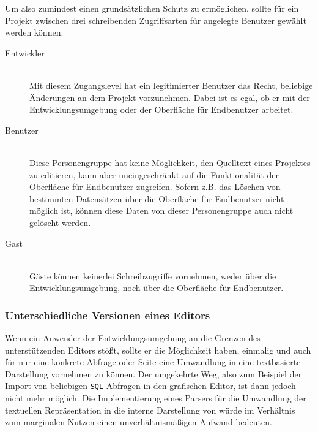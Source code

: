 Um also zumindest einen grundsätzlichen Schutz zu ermöglichen, sollte für ein Projekt zwischen drei schreibenden Zugriffsarten für angelegte Benutzer gewählt werden können:


\begin{description}
  \item[Entwickler] \hfill \\
    Mit diesem Zugangslevel hat ein legitimierter Benutzer das Recht, beliebige Änderungen an dem Projekt vorzunehmen. Dabei ist es egal, ob er mit der Entwicklungsumgebung oder der Oberfläche für Endbenutzer arbeitet.
  \item[Benutzer] \hfill \\
    Diese Personengruppe hat keine Möglichkeit, den Quelltext eines Projektes zu editieren, kann aber uneingeschränkt auf die Funktionalität der Oberfläche für Endbenutzer zugreifen. Sofern z.B. das Löschen von bestimmten Datensätzen über die Oberfläche für Endbenutzer nicht möglich ist, können diese Daten von dieser Personengruppe auch nicht gelöscht werden.
  \item[Gast] \hfill \\
    Gäste können keinerlei Schreibzugriffe vornehmen, weder über die Entwicklungsumgebung, noch über die Oberfläche für Endbenutzer.
\end{description}

\subsubsection{Unterschiedliche Versionen eines Editors}
\label{sec:editor-different-versions}

Wenn ein Anwender der Entwicklungsumgebung an die Grenzen des unterstützenden Editors stößt, sollte er die Möglichkeit haben, einmalig und auch für nur eine konkrete Abfrage oder Seite eine Umwandlung in eine textbasierte Darstellung vornehmen zu können. Der umgekehrte Weg, also zum Beispiel der Import von beliebigen \texttt{SQL}-Abfragen in den grafischen Editor, ist dann jedoch nicht mehr möglich. Die Implementierung eines Parsers für die Umwandlung der textuellen Repräsentation in die interne Darstellung von \idename{} würde im Verhältnis zum marginalen Nutzen einen unverhältnismäßigen Aufwand bedeuten.

